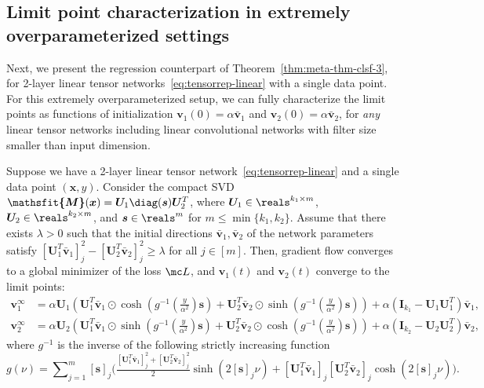 \documentclass{article} %
\def\vs{{\bm{s}}}
\def\vv{{\bm{v}}}
\def\vx{{\bm{x}}}
\def\mI{{\bm{I}}}
\def\mU{{\bm{U}}}
\newcommand{\tens}[1]{\bm{\mathsfit{#1}}}
\def\tM{{\tens{M}}}
\begin{document}
\subsection{Limit point characterization in extremely overparameterized settings}
Next, we present the regression counterpart of Theorem~\ref{thm:meta-thm-clsf-3}, for 2-layer linear tensor networks~\eqref{eq:tensorrep-linear} with a single data point. For this extremely overparameterized setup, we can fully characterize the limit points as functions of initialization $\vv_1(0) = \alpha \bar \vv_1$ and $\vv_2(0) = \alpha \bar \vv_2$, for \emph{any} linear tensor networks including linear convolutional networks with filter size smaller than input dimension.
\begin{theorem}
\label{thm:meta-thm-reg-2}
Suppose we have a 2-layer linear tensor network~\eqref{eq:tensorrep-linear} and a single data point $(\vx, y)$. Consider the compact SVD $\tM(\vx) = \mU_1 \diag(\vs) \mU_2^T$, where $\mU_1 \in \reals^{k_1 \times m}$, $\mU_2 \in \reals^{k_2 \times m}$, and $\vs \in \reals^{m}$ for $m \leq \min\{k_1, k_2\}$. Assume that there exists $\lambda > 0$ such that the initial directions $\bar \vv_1, \bar \vv_2$ of the network parameters satisfy $[\mU_1^T \bar \vv_1]_j^2 - [\mU_2^T \bar \vv_2]_j^2 \geq \lambda$ for all $j \in [m]$. Then, gradient flow converges to a global minimizer of the loss $\mc L$, and $\vv_1(t)$ and $\vv_2(t)$ converge to the limit points:
\begin{align*}
    \vv_1^\infty \!&=\! \alpha \mU_1\!
    \left ( \mU_1^T\bar \vv_1 \odot \cosh \left (g^{-1} \left (\frac{y}{\alpha^2} \right)\vs\right)
    + \mU_2^T\bar \vv_2 \odot \sinh \left (g^{-1} \left (\frac{y}{\alpha^2} \right) \vs \right)
    \right )
    \!+\!\alpha (\mI_{k_1} - \mU_1 \mU_1^T) \bar \vv_1,\\
    \vv_2^\infty \!&=\! \alpha \mU_2\!
    \left ( \mU_1^T\bar \vv_1 \odot \sinh \left (g^{-1} \left (\frac{y}{\alpha^2} \right) \vs \right)
    +
    \mU_2^T\bar \vv_2 \odot \cosh \left (g^{-1} \left (\frac{y}{\alpha^2} \right)\vs\right)
    \right )
    \!+\!\alpha (\mI_{k_2} - \mU_2 \mU_2^T) \bar \vv_2,
\end{align*}
where $g^{-1}$ is the inverse of the following strictly increasing function
\begin{equation*}
    g(\nu) = \sum\nolimits_{j=1}^m [\vs]_j \Big (\tfrac{[\mU_1^T\bar \vv_1]_j^2+[\mU_2^T\bar \vv_2]_j^2}{2} \sinh(2[\vs]_j \nu) + [\mU_1^T\bar \vv_1]_j [\mU_2^T\bar \vv_2]_j \cosh(2[\vs]_j \nu) \Big).
\end{equation*}
\end{theorem}
\end{document}
